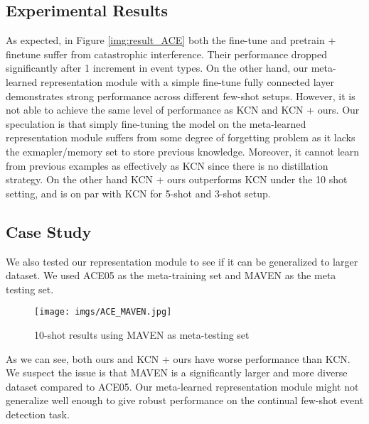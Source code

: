\subsection{Experimental Results}
As expected,  in Figure \ref{img:result_ACE} both the fine-tune and pretrain + finetune suffer from catastrophic interference. Their performance dropped significantly after 1 increment in event types. On the other hand, our meta-learned representation module with a simple fine-tune fully connected layer demonstrates strong performance across different few-shot setups.  However, it is not able to achieve the same level of performance as KCN and KCN + ours. Our speculation is that simply fine-tuning the model on the meta-learned representation module suffers from some degree of forgetting problem as it lacks the exmapler/memory set to store previous knowledge. Moreover, it cannot learn from previous examples as effectively as KCN since there is no distillation strategy. On the other hand KCN + ours outperforms KCN under the 10 shot setting, and is on par with KCN for 5-shot and 3-shot setup. 

\subsection{Case Study}
We also tested our representation module to see if it can be generalized to larger dataset.  We used ACE05 as the meta-training set and MAVEN as the meta testing set. 

\begin{figure}[h]
\centering
    \texttt{[image: imgs/ACE\_MAVEN.jpg]}
    \caption{10-shot results using MAVEN as meta-testing set}
    \label{img:result_MAVEN}
\end{figure}

As we can see,  both ours and KCN + ours have worse performance than KCN.  We suspect the issue is that MAVEN is a significantly larger and more diverse dataset compared to ACE05. Our meta-learned representation module might not generalize well enough to give robust performance on the continual few-shot event detection task.
